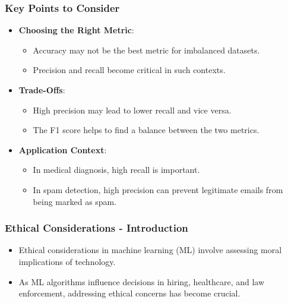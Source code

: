 \documentclass[aspectratio=169]{beamer}
\begin{document}
\begin{frame}[fragile]
    \frametitle{Key Points to Consider}
    \begin{itemize}
        \item \textbf{Choosing the Right Metric}:
        \begin{itemize}
            \item Accuracy may not be the best metric for imbalanced datasets.
            \item Precision and recall become critical in such contexts.
        \end{itemize}
        
        \item \textbf{Trade-Offs}:
        \begin{itemize}
            \item High precision may lead to lower recall and vice versa.
            \item The F1 score helps to find a balance between the two metrics.
        \end{itemize}
        
        \item \textbf{Application Context}:
        \begin{itemize}
            \item In medical diagnosis, high recall is important.
            \item In spam detection, high precision can prevent legitimate emails from being marked as spam.
        \end{itemize}
    \end{itemize}
\end{frame}

\begin{frame}[fragile]
    \frametitle{Ethical Considerations - Introduction}
    \begin{itemize}
        \item Ethical considerations in machine learning (ML) involve assessing moral implications of technology.
        \item As ML algorithms influence decisions in hiring, healthcare, and law enforcement, addressing ethical concerns has become crucial.
    \end{itemize}
\end{frame}
\end{document}
